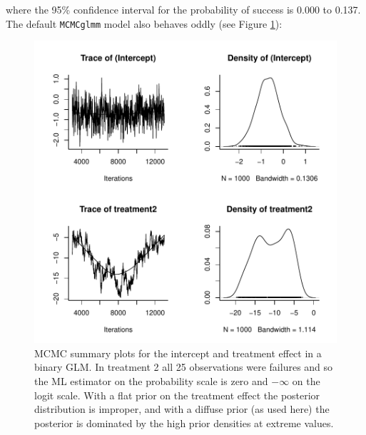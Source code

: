 \documentclass{article}
\begin{document}
where the  95\% confidence interval for the probability of success is  0.000 to 0.137.\\

The default \texttt{MCMCglmm} model also behaves oddly (see Figure \ref{separation1-fig}):

\begin{Schunk}
\end{Schunk}



\begin{figure}[!h]
\begin{center}
\includegraphics{Lecture2-078}
\end{center}
\caption{MCMC summary plots for the intercept and treatment effect in a binary GLM. In treatment 2 all 25 observations were failures and so the ML estimator on the probability scale is zero and $-\infty$ on the logit scale. With a flat prior on the treatment effect the posterior distribution is improper, and with a diffuse prior (as used here) the posterior is dominated by the high prior densities at extreme values.}
\label{separation1-fig}
\end{figure}
\end{document}
